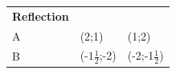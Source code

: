 {{\begin{center}
\begin{xtabular}[t]{|l|l|l|}
    
        
                    \textbf{Reflection}
     \tabularnewline{}
    
    
        A &
    
    
        (2;1) &
    
    
        (1;2)%
     \tabularnewline{}
    
    
        B &
    
    
        (-$1\frac{1}{2}$;-2) &
    
    
        (-2;-1$\frac{1}{2}$)%
     \tabularnewline{}
    

\end{xtabular}
\end{center}}}
